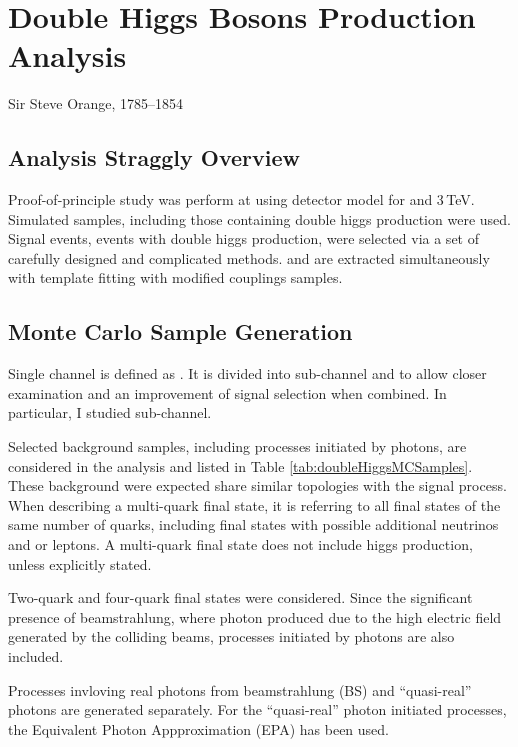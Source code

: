 \chapter{Double Higgs Bosons Production Analysis}
\label{chap:DoubleHiggs}

%
{Sir Steve Orange, 1785--1854}%

\section{Analysis Straggly Overview}

Proof-of-principle study was perform at \CLIC using \CLICILD detector model for  and 3\,TeV. Simulated samples, including those containing double higgs production were used. Signal events, events with double higgs production, were selected via a set of carefully designed and complicated methods. \gHHH and \gWWHH are extracted simultaneously with template fitting with modified couplings samples.

\section{Monte Carlo Sample Generation}


Single channel is defined as \eeToHH. It is divided into sub-channel \eeToHHbbWW and \eeToHHbbbb to allow closer examination and an improvement of signal selection when combined. In particular, I studied \eeToHHbbWW sub-channel.

Selected background samples, including processes initiated by photons, are considered in the analysis and listed in Table \ref{tab:doubleHiggsMCSamples}. These background were expected share similar topologies with the signal process. When describing a multi-quark final state, it is referring to  all final states of the same number of quarks, including final states with possible additional neutrinos and or leptons. A multi-quark final state does not include higgs production, unless explicitly stated.

Two-quark and four-quark final states were considered.
Since the significant presence of beamstrahlung, where photon produced due to the high electric field generated by the colliding beams, processes initiated by photons are also included.

Processes invloving real photons from beamstrahlung (BS) and ``quasi-real'' photons are generated separately. For the ``quasi-real'' photon initiated processes, the Equivalent Photon Appproximation (EPA) has been used.

